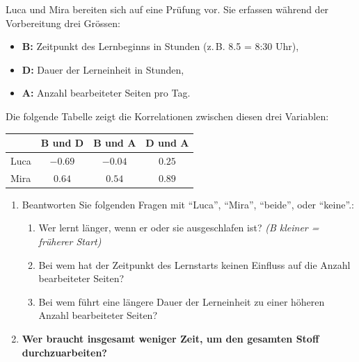 \begin{myexercise}
    Luca und Mira bereiten sich auf eine Prüfung vor. Sie erfassen während der Vorbereitung drei Grössen:
    \begin{itemize}
        \item \textbf{B:} Zeitpunkt des Lernbeginns in Stunden (z.\,B. 8.5 = 8:30 Uhr),
        \item \textbf{D:} Dauer der Lerneinheit in Stunden,
        \item \textbf{A:} Anzahl bearbeiteter Seiten pro Tag.
    \end{itemize}
    Die folgende Tabelle zeigt die Korrelationen zwischen diesen drei Variablen:

    \begin{table}[H]
        \centering
        \begin{tabular}{l|c|c|c}

                 & B und D & B und A & D und A \\
            \midrule\midrule
            Luca & $-0.69$ & $-0.04$ & $0.25$  \\\midrule
            Mira & $0.64$  & $0.54$  & $0.89$  \\
        \end{tabular}
    \end{table}

    \begin{enumerate}
        \item Beantworten Sie folgenden Fragen mit \enquote{Luca}, \enquote{Mira}, \enquote{beide}, oder \enquote{keine}.:
              \begin{enumerate}
                  \item Wer lernt länger, wenn er oder sie ausgeschlafen ist? \hfill \textit{(B kleiner = früherer Start)}
                  \item Bei wem hat der Zeitpunkt des Lernstarts keinen Einfluss auf die Anzahl bearbeiteter Seiten?
                  \item Bei wem führt eine längere Dauer der Lerneinheit zu einer höheren Anzahl bearbeiteter Seiten?
              \end{enumerate}
        \item \textbf{Wer braucht insgesamt weniger Zeit, um den gesamten Stoff durchzuarbeiten?}
    \end{enumerate}


\end{myexercise}
